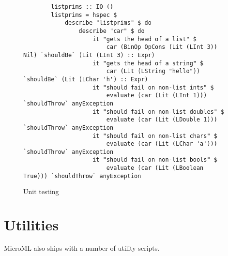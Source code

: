 \begin{figure}
    \begin{verbatim}
        listprims :: IO ()
        listprims = hspec $ 
            describe "listprims" $ do
                describe "car" $ do
                    it "gets the head of a list" $ 
                        car (BinOp OpCons (Lit (LInt 3)) Nil) `shouldBe` (Lit (LInt 3) :: Expr)
                    it "gets the head of a string" $
                        car (Lit (LString "hello")) `shouldBe` (Lit (LChar 'h') :: Expr)
                    it "should fail on non-list ints" $ 
                        evaluate (car (Lit (LInt 1)))        `shouldThrow` anyException
                    it "should fail on non-list doubles" $ 
                        evaluate (car (Lit (LDouble 1)))     `shouldThrow` anyException
                    it "should fail on non-list chars" $ 
                        evaluate (car (Lit (LChar 'a')))     `shouldThrow` anyException
                    it "should fail on non-list bools" $ 
                        evaluate (car (Lit (LBoolean True))) `shouldThrow` anyException
    \end{verbatim}
    \caption{Unit testing}
\label{fig:unit}
\end{figure}


\section{Utilities}
MicroML also ships with a number of utility scripts.

